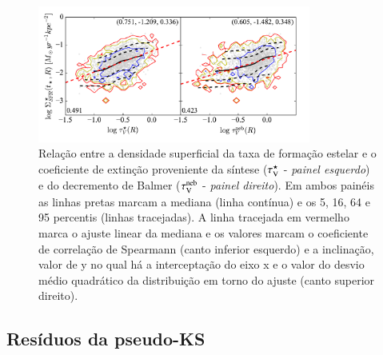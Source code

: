 \begin{figure}
	\centering
	\includegraphics[width=0.8\textwidth]{figuras/pseudoKS.pdf}
	\caption[Relação pseudo-KS.]
	{Relação entre a densidade superficial da taxa de formação estelar e o coeficiente de extinção
proveniente da síntese ($\tau_{\mathrm{V}}^\star$ - {\em painel esquerdo}) e do decremento de Balmer ($\tau_{\mathrm{V}}^{\mathrm{neb}}$ -
{\em painel direito}). Em ambos painéis as linhas pretas marcam a mediana (linha contínua) e os 5,
16, 64 e 95 percentis (linhas tracejadas). A linha tracejada em vermelho marca o ajuste linear da
mediana e os valores marcam o coeficiente de correlação de Spearmann (canto inferior esquerdo) e a
inclinação, valor de y no qual há a interceptação do eixo x e o valor do desvio médio quadrático da
distribuição em torno do ajuste (canto superior direito).}
	\label{fig:pseudoKS}
\end{figure}

\subsection{Resíduos da pseudo-KS}
\label{sec:gasfrac:KS:resid}
 
